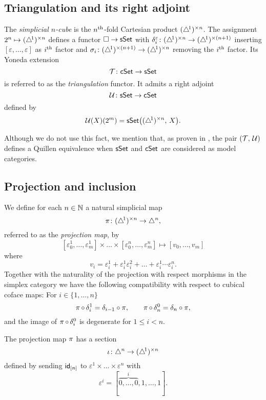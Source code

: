 \subsection{Triangulation and its right adjoint}

The \textit{simplicial $n$-cube} is the $n^{\mathrm{th}}$-fold Cartesian product $(\triangle^{\!1})^{\times n}$.
The assignment $2^n \mapsto (\triangle^{\!1})^{\times n}$ defines a functor $\square \to \mathsf{sSet}$ with $\delta_i^\varepsilon \colon (\triangle^{\!1})^{\times n} \to (\triangle^{\!1})^{\times (n+1)}$ inserting $[\varepsilon, \dots, \varepsilon]$ as $i^{\mathrm{th}}$ factor and $\sigma_i \colon (\triangle^{\!1})^{\times (n+1)} \to (\triangle^{\!1})^{\times n}$ removing the $i^{\mathrm{th}}$ factor.
Its Yoneda extension
\[
\operatorname{\mathcal{T}} \colon \mathsf{cSet} \to \mathsf{sSet}
\]
is referred to as the \textit{triangulation} functor.
It admits a right adjoint
\[
\operatorname{\mathcal{U}} \colon \mathsf{sSet} \to \mathsf{cSet}
\]
defined by
\[
\operatorname{\mathcal{U}}(X)(2^m) = \mathsf{sSet} \big( (\triangle^{\!1})^{\times n}, \, X \big).
\]

Although we do not use this fact, we mention that, as proven in \cite[.30]{cisinski2006presheaves}, the pair $(\operatorname{\mathcal{T}},\, \operatorname{\mathcal{U}})$ defines a Quillen equivalence when $\mathsf{sSet}$ and $\mathsf{cSet}$ are considered as model categories.

\subsection{Projection and inclusion} \label{ss:projection and inclusion}

We define for each $n \in \mathbb{N}$ a natural simplicial map
\[
\operatorname{\pi} \colon (\triangle^{\!1})^{\times n} \to \triangle^n,
\]
referred to as the \textit{projection map}, by
\[
[\varepsilon_0^1, \dots, \varepsilon_m^1] \times \dots \times [ \varepsilon_0^n, \dots, \varepsilon_m^n] \mapsto
[v_0, \dots, v_m]
\]
where
\[
v_i = \varepsilon_i^1 + \varepsilon_i^1 \varepsilon_i^2 + \dots + \varepsilon_i^1 \dotsm \varepsilon_i^n.
\]
Together with the naturality of the projection with respect morphisms in the simplex category we have the following compatibility with respect to cubical coface maps:
For $i \in \{1,\dots,n\}$
\begin{equation} \label{e:projection cubical compatibility}
\operatorname{\pi} \circ \, \delta_i^1 = \delta_{i-1} \circ \pi, \qquad
\operatorname{\pi} \circ \, \delta_n^0 = \delta_{n} \circ \pi,
\end{equation}
and the image of $\operatorname{\pi} \circ \, \delta^0_i$ is degenerate for $1 \leq i < n$.

The projection map $\operatorname{\pi}$ has a section
\[
\operatorname{\iota} \colon \triangle^n \to (\triangle^{\!1})^{\times n}
\]
defined by sending $\mathsf{id}_{[n]}$ to $\varepsilon^1 \times \dots \times \varepsilon^n$ with
\[
\varepsilon^i = [\overbrace{0, \dots, 0}^{i}, 1, \dots, 1].
\]

